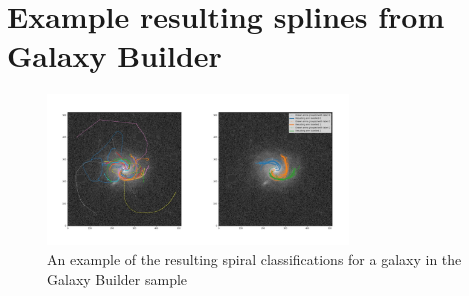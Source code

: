 \documentclass[../main.tex]{subfiles}
\begin{document}

\section{Example resulting splines from Galaxy Builder}
\label{appendix:exampleSplines}

\begin{figure}
  \includegraphics[width=8cm]{images/montage-subject-21096891.jpg}
  \caption{An example of the resulting spiral classifications for a galaxy in the Galaxy Builder sample}
\end{figure}
\end{document}
